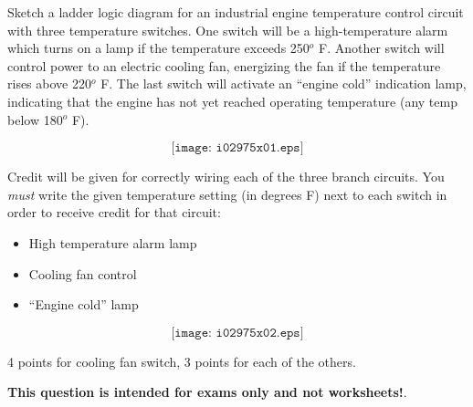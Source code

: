 

Sketch a ladder logic diagram for an industrial engine temperature control circuit with three temperature switches.  One switch will be a high-temperature alarm which turns on a lamp if the temperature exceeds 250$^{o}$ F.  Another switch will control power to an electric cooling fan, energizing the fan if the temperature rises above 220$^{o}$ F.  The last switch will activate an ``engine cold'' indication lamp, indicating that the engine has not yet reached operating temperature (any temp below 180$^{o}$ F).

$$\texttt{[image: i02975x01.eps]}$$

\vskip 10pt

\noindent
Credit will be given for correctly wiring each of the three branch circuits.  You {\it must} write the given temperature setting (in degrees F) next to each switch in order to receive credit for that circuit:

\begin{itemize}
\item{} High temperature alarm lamp
\item{} Cooling fan control
\item{} ``Engine cold'' lamp
\end{itemize}







$$\texttt{[image: i02975x02.eps]}$$

4 points for cooling fan switch, 3 points for each of the others.







{\bf This question is intended for exams only and not worksheets!}.



